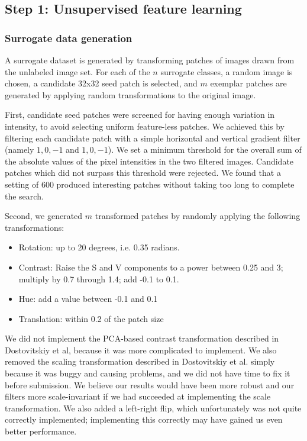 \documentclass{article} %
\newenvironment{itemizedense}{
\begin{itemize}
  \setlength{\itemsep}{1pt}
  \setlength{\parskip}{0pt}
  \setlength{\parsep}{0pt}
}{\end{itemize}}
\begin{document}
\subsection{Step 1: Unsupervised feature learning}

\subsubsection{Surrogate data generation}

A surrogate dataset is generated by transforming patches of images drawn from the unlabeled image set. For each of the $n$ surrogate classes, a random image is chosen, a candidate 32x32 seed patch is selected, and $m$ exemplar patches are generated by applying random transformations to the original image.

First, candidate seed patches were screened for having enough variation in intensity, to avoid selecting uniform feature-less patches. We achieved this by filtering each candidate patch with a simple horizontal and vertical gradient filter (namely ${{1, 0, -1}}$ and ${{1},{0},{-1}}$). We set a minimum threshold for the overall sum of the absolute values of the pixel intensities in the two filtered images. Candidate patches which did not surpass this threshold were rejected. We found that a setting of $600$ produced interesting patches without taking too long to complete the search. 

Second, we generated $m$ transformed patches by randomly applying the following transformations:

\begin{itemizedense}
\item Rotation: up to 20 degrees, i.e. 0.35 radians.
\item Contrast: Raise the S and V components to a power between 0.25 and 3; multiply by 0.7 through 1.4; add -0.1 to 0.1.
\item Hue: add a value between -0.1 and 0.1
\item Translation: within 0.2 of the patch size
\end{itemizedense}

We did not implement the PCA-based contrast transformation described in Dostovitskiy et al, because it was more complicated to implement. We also removed the scaling transformation described in Dostovitskiy et al. simply because it was buggy and causing problems, and we did not have time to fix it before submission. We believe our results would have been more robust and our filters more scale-invariant if we had succeeded at implementing the scale transformation. We also added a left-right flip, which unfortunately was not quite correctly implemented; implementing this correctly may have gained us even better performance.
\end{document}
